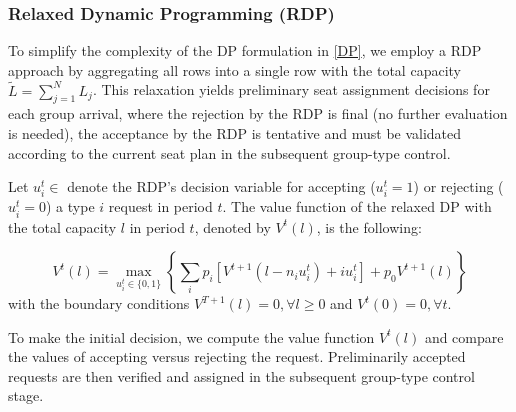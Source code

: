 
\subsubsection{Relaxed Dynamic Programming (RDP)}
To simplify the complexity of the DP formulation in \eqref{DP}, we employ a RDP approach by aggregating all rows into a single row with the total capacity $\tilde{L} = \sum_{j=1}^{N} L_j$. This relaxation yields preliminary seat assignment decisions for each group arrival, where the rejection by the RDP is final (no further evaluation is needed), the acceptance by the RDP is tentative and must be validated according to the current seat plan in the subsequent group-type control.

Let $u_{i}^{t} \in $ denote the RDP's decision variable for accepting ($u_{i}^{t} = 1$) or rejecting ($u_{i}^{t} = 0$) a type $i$ request in period $t$. The value function of the relaxed DP with the total capacity $l$ in period $t$, denoted by $V^{t}(l)$, is the following:

\begin{equation}\label{DP_relaxed}
V^{t}(l) =  \max_{u_{i}^{t} \in \{0,1\}} \left\{ \sum_{i} p_i \left[V^{t+1}(l-n_i u_{i}^{t})+ i u_{i}^{t}\right] + p_0 V^{t+1}(l)\right\}
\end{equation}
with the boundary conditions $V^{T+1}(l) =0, \forall l \geq 0$ and $V^{t}(0) =0, \forall t$.


To make the initial decision, we compute the value function $V^{t}(l)$ and compare the values of accepting versus rejecting the request. Preliminarily accepted requests are then verified and assigned in the subsequent group-type control stage.






